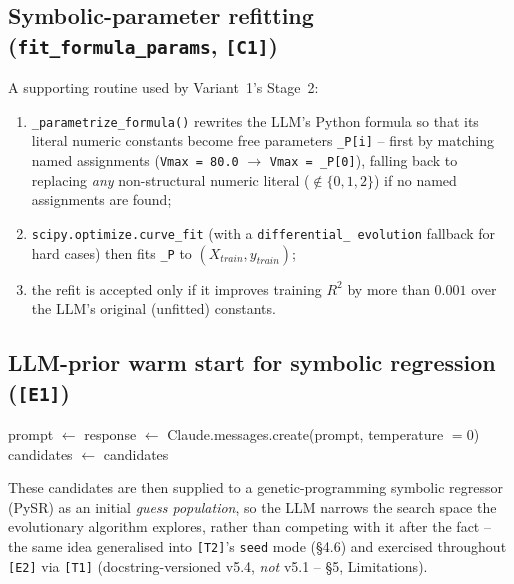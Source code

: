 \documentclass[11pt,a4paper]{article}
\newcommand{\code}[1]{\texttt{\small #1}}
\begin{document}
\subsection{Symbolic-parameter refitting (\code{fit\_formula\_params}, \code{[C1]})}
A supporting routine used by Variant~1's Stage~2:
\begin{enumerate}
  \item \code{\_parametrize\_formula()} rewrites the LLM's Python formula
        so that its literal numeric constants become free parameters
        \code{\_P[i]} -- first by matching named assignments
        (\code{Vmax = 80.0} $\to$ \code{Vmax = \_P[0]}), falling back to
        replacing \emph{any} non-structural numeric literal
        ($\notin\{0,1,2\}$) if no named assignments are found;
  \item \code{scipy.optimize.curve\_fit} (with a \code{differential\_
        evolution} fallback for hard cases) then fits \code{\_P} to
        $(X_{train}, y_{train})$;
  \item the refit is accepted only if it improves training $R^2$ by more
        than $0.001$ over the LLM's original (unfitted) constants.
\end{enumerate}

\subsection{LLM-prior warm start for symbolic regression (\code{[E1]})}
\begin{algorithm}[H]
\caption{\code{get\_llm\_prior}(eq, $X_{train}$, $y_{train}$) $\to$ PySR \code{guesses}}
\begin{algorithmic}[1]
\State prompt $\gets$ 
\State response $\gets$ Claude.messages.create(prompt, temperature $=0$)
\State candidates $\gets$  
\State \Return candidates 
\end{algorithmic}
\end{algorithm}
These candidates are then supplied to a genetic-programming symbolic
regressor (PySR) as an initial \emph{guess population}, so the LLM narrows
the search space the evolutionary algorithm explores, rather than competing
with it after the fact -- the same idea generalised into \code{[T2]}'s
\code{seed} mode (\S4.6) and exercised throughout \code{[E2]} via
\code{[T1]} (docstring-versioned v5.4, \emph{not} v5.1 -- \S5, Limitations).
\end{document}
